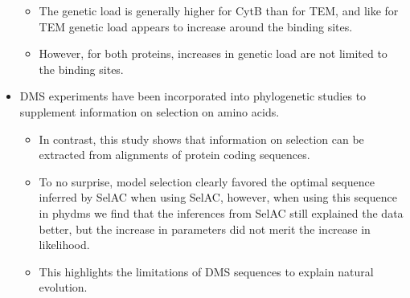 \documentclass[12pt]{article}
\begin{document}
\begin{itemize}
\begin{itemize}
		\item The genetic load is generally higher for CytB than for TEM, and like for TEM genetic load appears to increase around the binding sites.
		\item However, for both proteins, increases in genetic load are not limited to the binding sites.
	\end{itemize}
	\item DMS experiments have been incorporated into phylogenetic studies to supplement information on selection on amino acids.
	\begin{itemize}
		\item In contrast, this study shows that information on selection can be extracted from alignments of protein coding sequences.
		\item To no surprise, model selection clearly favored the optimal sequence inferred by SelAC when using SelAC, however, when using this sequence in phydms we find that the inferences from SelAC still explained the data better, but the increase in parameters did not merit the increase in likelihood.
		\item This highlights the limitations of DMS sequences to explain natural evolution.
	\end{itemize}

\end{itemize}
\end{document}
